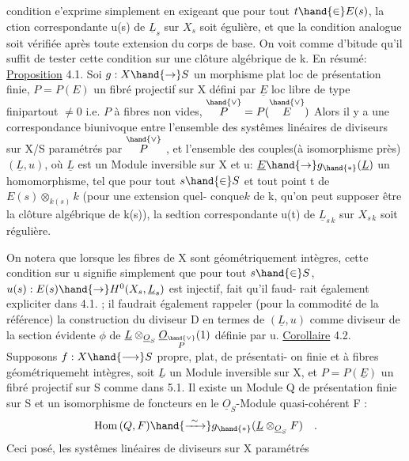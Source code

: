 
condition e'exprime simplement en exigeant que pour tout $t\hand{\in} E(s)$,
la ction correspondante u(s) de $\underline{L}_s$ sur $X_s$ soit égulière, et que la
condition analogue soit vérifiée après toute extension du corps de base.
On voit comme d'bitude qu'il suffit de tester cette condition sur une
clôture algébrique de k. En résumé:
\uline{Proposition} 4.1. Soi $g:X\hand{\to} S$ un morphisme plat loc de présentation
finie, $P=P(E)$ un fibré projectif sur X défini par $\underline{E}$ loc libre de type
finipartout $\neq 0$ i.e. $P$ à fibres non vides, $\overset{\hand{\vee}}{P} = P(\overset{\hand{\vee}}{E})$ \hand{,} Alors il y a une correspondance biunivoque entre
l'ensemble des systêmes linéaires de diviseurs sur X/S paramétrés par $\overset{\hand{\vee}}{P}$ ,
et l'ensemble des couples(à isomorphisme près) $(\underline{L},u)$, où $\underline{L}$ est un
Module inversible sur X et u: $\underline{E}\hand{\to} g_{\hand{*}}(\underline{L})$ un homomorphisme, tel que
pour tout $s\hand{\in} S$ et tout point t de $E(s)\otimes_{k(s)}k$ (pour une extension quel-%
\placedmargin{$\cdot$} conque$k$ de k, qu'on peut supposer être la clôture algébrique de k(s)),
la sedtion correspondante u(t) de $\underline{L}_{s\,k}$ sur $X_{s\,k}$ soit régulière.

On notera que lorsque les fibres de X sont 
géométriquement intègres, cette condition sur u signifie simplement que
pour tout $s\hand{\in} S$, $u(s): E(s)\hand{\rightarrow} H^{0}(X_s,\underline{L}_s)$ est injectif, fait qu'il faud-%
rait également expliciter dans 4.1. ;  il faudrait également rappeler
(pour la commodité de la référence) la construction du diviseur D en
termes de $(\underline{L},u)$ comme diviseur de la section évidente $\phi$ de $\underline{L}\otimes_{\underline{O}_S}\underline{O}_{\overset{\hand{\vee}}{P}}(1)$
définie par u.
\uline{Corollaire} 4.2.  Supposons $f: X\hand{\longrightarrow} S$ propre, plat, de présentati-%
on finie et à fibres géométriquemeht intègres,  soit $\underline{L}$ un Module
inversible sur X, et $P=P(\underline{E})$ un fibré projectif sur S comme dans 5.1.
 Il existe un Module Q de présentation finie sur S et un
isomorphisme de foncteurs en le $\underline{O}_S$-Module quasi-cohérent F :
\[ \mathrm{Hom}\,(Q,F) \hand{\xrightarrow{\ \sim\ }} g_{\hand{*}}(\underline{L}\otimes_{\underline{O}_S}F) \quad . \]
Ceci posé, les  systêmes linéaires de diviseurs sur X paramétrés

